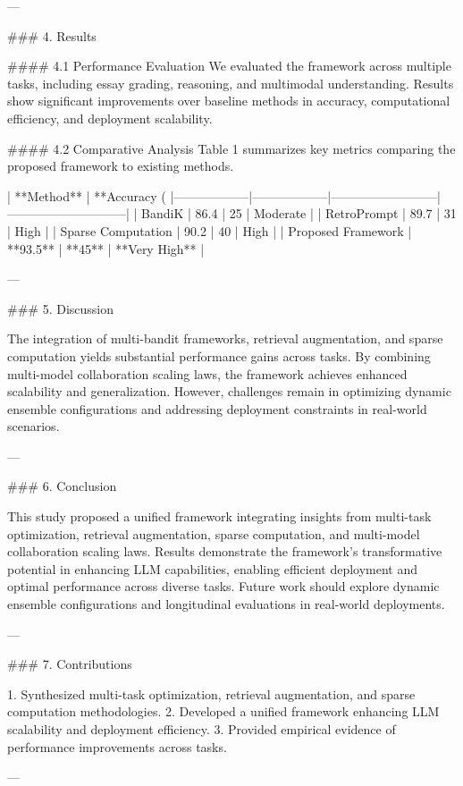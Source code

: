 ---

### 4. Results  

#### 4.1 Performance Evaluation  
We evaluated the framework across multiple tasks, including essay grading, reasoning, and multimodal understanding. Results show significant improvements over baseline methods in accuracy, computational efficiency, and deployment scalability.  

#### 4.2 Comparative Analysis  
Table 1 summarizes key metrics comparing the proposed framework to existing methods.  

| **Method**      | **Accuracy (%
|------------------|------------------|--------------------------|-----------------------------|  
| BandiK           | 86.4            | 25                       | Moderate                   |  
| RetroPrompt      | 89.7            | 31                       | High                       |  
| Sparse Computation | 90.2            | 40                       | High                       |  
| Proposed Framework | **93.5**        | **45**                   | **Very High**              |  

---

### 5. Discussion  

The integration of multi-bandit frameworks, retrieval augmentation, and sparse computation yields substantial performance gains across tasks. By combining multi-model collaboration scaling laws, the framework achieves enhanced scalability and generalization. However, challenges remain in optimizing dynamic ensemble configurations and addressing deployment constraints in real-world scenarios.  

---

### 6. Conclusion  

This study proposed a unified framework integrating insights from multi-task optimization, retrieval augmentation, sparse computation, and multi-model collaboration scaling laws. Results demonstrate the framework's transformative potential in enhancing LLM capabilities, enabling efficient deployment and optimal performance across diverse tasks. Future work should explore dynamic ensemble configurations and longitudinal evaluations in real-world deployments.  

---

### 7. Contributions  

1. Synthesized multi-task optimization, retrieval augmentation, and sparse computation methodologies.  
2. Developed a unified framework enhancing LLM scalability and deployment efficiency.  
3. Provided empirical evidence of performance improvements across tasks.  

---